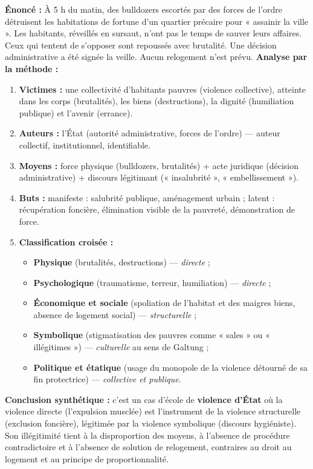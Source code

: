 \documentclass[11pt]{article}
\begin{document}
\begin{exoresolu}
\textbf{Énoncé :} À 5 h du matin, des bulldozers escortés par des forces de l'ordre détruisent les habitations de fortune d'un quartier précaire pour « assainir la ville ». Les habitants, réveillés en sursaut, n'ont pas le temps de sauver leurs affaires. Ceux qui tentent de s'opposer sont repoussés avec brutalité. Une décision administrative a été signée la veille. Aucun relogement n'est prévu.
\tcblower
\textbf{Analyse par la méthode :}
\begin{enumerate}
    \item \textbf{Victimes :} une collectivité d'habitants pauvres (violence collective), atteinte dans les corps (brutalités), les biens (destructions), la dignité (humiliation publique) et l'avenir (errance).
    \item \textbf{Auteurs :} l'État (autorité administrative, forces de l'ordre) — auteur collectif, institutionnel, identifiable.
    \item \textbf{Moyens :} force physique (bulldozers, brutalités) + acte juridique (décision administrative) + discours légitimant (« insalubrité », « embellissement »).
    \item \textbf{Buts :} manifeste : salubrité publique, aménagement urbain ; latent : récupération foncière, élimination visible de la pauvreté, démonstration de force.
    \item \textbf{Classification croisée :}
    \begin{itemize}
        \item \textbf{Physique} (brutalités, destructions) — \emph{directe} ;
        \item \textbf{Psychologique} (traumatisme, terreur, humiliation) — \emph{directe} ;
        \item \textbf{Économique et sociale} (spoliation de l'habitat et des maigres biens, absence de logement social) — \emph{structurelle} ;
        \item \textbf{Symbolique} (stigmatisation des pauvres comme « sales » ou « illégitimes ») — \emph{culturelle} au sens de Galtung ;
        \item \textbf{Politique et étatique} (usage du monopole de la violence détourné de sa fin protectrice) — \emph{collective et publique}.
    \end{itemize}
\end{enumerate}
\textbf{Conclusion synthétique :} c'est un cas d'école de \textbf{violence d'État} où la violence directe (l'expulsion musclée) est l'instrument de la violence structurelle (exclusion foncière), légitimée par la violence symbolique (discours hygiéniste). Son illégitimité tient à la disproportion des moyens, à l'absence de procédure contradictoire et à l'absence de solution de relogement, contraires au droit au logement et au principe de proportionnalité.
\end{exoresolu}
\end{document}
